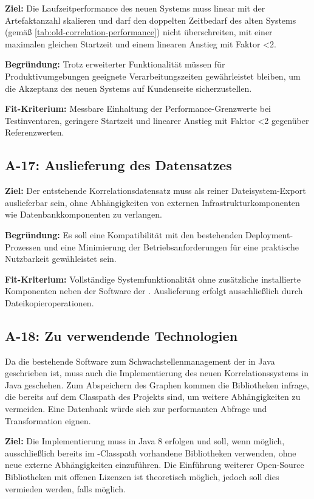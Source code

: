 \textbf{Ziel:}
Die Laufzeitperformance des neuen Systems muss linear mit der Artefaktanzahl skalieren und darf den doppelten Zeitbedarf des alten Systems (gemäß \autoref{tab:old-correlation-performance}) nicht überschreiten, mit einer maximalen gleichen Startzeit und einem linearen Anstieg mit Faktor <2.

\textbf{Begründung:}
Trotz erweiterter Funktionalität müssen für Produktivumgebungen geeignete Verarbeitungszeiten gewährleistet bleiben, um die Akzeptanz des neuen Systems auf Kundenseite sicherzustellen.

\textbf{Fit-Kriterium:}
Messbare Einhaltung der Performance-Grenzwerte bei Testinventaren, geringere Startzeit und linearer Anstieg mit Faktor <2 gegenüber Referenzwerten.

\subsection{A-17: Auslieferung des Datensatzes}\label{subsec:req-correlation-data-delivery}

\textbf{Ziel:}
Der entstehende Korrelationsdatensatz muss als reiner Dateisystem-Export auslieferbar sein, ohne Abhängigkeiten von externen Infrastrukturkomponenten wie Datenbankkomponenten zu verlangen.

\textbf{Begründung:}
Es soll eine Kompatibilität mit den bestehenden Deployment-Prozessen und eine Minimierung der Betriebsanforderungen für eine praktische Nutzbarkeit gewähleistet sein.

\textbf{Fit-Kriterium:}
Vollständige Systemfunktionalität ohne zusätzliche installierte Komponenten neben der Software der \metaeffekt.
Auslieferung erfolgt ausschließlich durch Dateikopieroperationen.

\subsection{A-18: Zu verwendende Technologien}\label{subsec:req-lang-java}

Da die bestehende Software zum Schwachstellenmanagement der \metaeffektsp in Java geschrieben ist, muss auch die Implementierung des neuen Korrelationssystems in Java geschehen.
Zum Abspeichern des Graphen kommen die Bibliotheken infrage, die bereits auf dem Classpath des Projekts sind, um weitere Abhängigkeiten zu vermeiden.
Eine Datenbank würde sich zur performanten Abfrage und Transformation eignen.

\textbf{Ziel:}
Die Implementierung muss in Java 8 erfolgen und soll, wenn möglich, ausschließlich bereits im \metaeffekt-Classpath vorhandene Bibliotheken verwenden, ohne neue externe Abhängigkeiten einzuführen.
Die Einführung weiterer Open-Source Bibliotheken mit offenen Lizenzen ist theoretisch möglich, jedoch soll dies vermieden werden, falls möglich.

